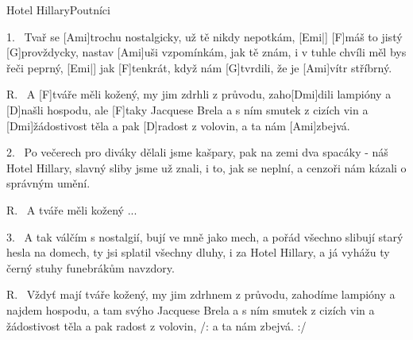 \begin{song}{Hotel Hillary}{Poutníci}

\begin{xverse}{1.~}
Tvař se [Ami]trochu nostalgicky, už tě nikdy nepotkám, [Emi|]{}
[F]máš to jistý [G]provždycky, nastav [Ami]uši vzpomínkám,
jak tě znám, i v tuhle chvíli měl bys řeči peprný, [Emi|]{}
jak [F]tenkrát, když nám [G]tvrdili, že je [Ami]vítr stříbrný.
\end{xverse}

\begin{xverse}{R.~}
A [F]tváře měli kožený, my jim zdrhli z průvodu,
zaho[Dmi]dili lampióny a [D]našli hospodu,
ale [F]taky Jacquese Brela a s ním smutek z cizích vin
a [Dmi]{žádo}stivost těla a pak [D]radost z volovin,
a ta nám [Ami]zbejvá.
\end{xverse}

\begin{xverse}{2.~}
Po večerech pro diváky dělali jsme kašpary,
pak na zemi dva spacáky - náš Hotel Hillary,
slavný sliby jsme už znali, i to, jak se neplní,
a cenzoři nám kázali o správným umění.
\end{xverse}


\begin{xverse}{R.~}
A tváře měli kožený ...
\end{xverse}


\begin{xverse}{3.~}
A tak válčím s nostalgií, bují ve mně jako mech,
a pořád všechno slibují starý hesla na domech,
ty jsi splatil všechny dluhy, i za Hotel Hillary,
a já vyhážu ty černý stuhy funebrákům navzdory.
\end{xverse}


\begin{xverse}{R.~}
Vždyť mají tváře kožený, my jim zdrhnem z průvodu,
zahodíme lampióny a najdem hospodu,
a tam svýho Jacquese Brela a s ním smutek z cizích vin
a žádostivost těla a pak radost z volovin,
/: a ta nám zbejvá. :/
\end{xverse}
\end{song}

